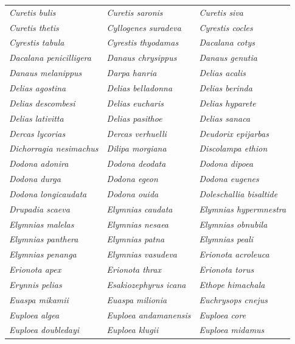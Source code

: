 \documentclass[runningheads]{llncs}
\begin{document}
\begin{longtable}{lll}
\textit{Curetis bulis} & \textit{Curetis saronis} & \textit{Curetis siva} \\
\textit{Curetis thetis} & \textit{Cyllogenes suradeva} & \textit{Cyrestis cocles} \\
\textit{Cyrestis tabula} & \textit{Cyrestis thyodamas} & \textit{Dacalana cotys} \\
\textit{Dacalana penicilligera} & \textit{Danaus chrysippus} & \textit{Danaus genutia} \\
\textit{Danaus melanippus} & \textit{Darpa hanria} & \textit{Delias acalis} \\
\textit{Delias agostina} & \textit{Delias belladonna} & \textit{Delias berinda} \\
\textit{Delias descombesi} & \textit{Delias eucharis} & \textit{Delias hyparete} \\
\textit{Delias lativitta} & \textit{Delias pasithoe} & \textit{Delias sanaca} \\
\textit{Dercas lycorias} & \textit{Dercas verhuelli} & \textit{Deudorix epijarbas} \\
\textit{Dichorragia nesimachus} & \textit{Dilipa morgiana} & \textit{Discolampa ethion} \\
\textit{Dodona adonira} & \textit{Dodona deodata} & \textit{Dodona dipoea} \\
\textit{Dodona durga} & \textit{Dodona egeon} & \textit{Dodona eugenes} \\
\textit{Dodona longicaudata} & \textit{Dodona ouida} & \textit{Doleschallia bisaltide} \\
\textit{Drupadia scaeva} & \textit{Elymnias caudata} & \textit{Elymnias hypermnestra} \\
\textit{Elymnias malelas} & \textit{Elymnias nesaea} & \textit{Elymnias obnubila} \\
\textit{Elymnias panthera} & \textit{Elymnias patna} & \textit{Elymnias peali} \\
\textit{Elymnias penanga} & \textit{Elymnias vasudeva} & \textit{Erionota acroleuca} \\
\textit{Erionota apex} & \textit{Erionota thrax} & \textit{Erionota torus} \\
\textit{Erynnis pelias} & \textit{Esakiozephyrus icana} & \textit{Ethope himachala} \\
\textit{Euaspa mikamii} & \textit{Euaspa milionia} & \textit{Euchrysops cnejus} \\
\textit{Euploea algea} & \textit{Euploea andamanensis} & \textit{Euploea core} \\
\textit{Euploea doubledayi} & \textit{Euploea klugii} & \textit{Euploea midamus} \\

\end{longtable}
\end{document}
